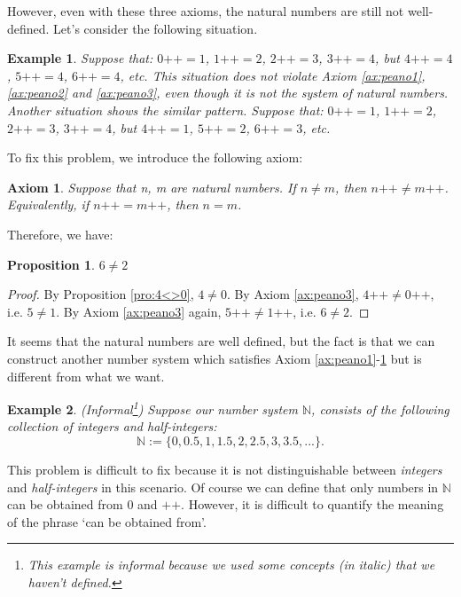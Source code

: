 \documentclass[a4paper,oneside]{book}
\newtheorem*{proof}{\textit{Proof.}}
\newtheorem{axiom}{Axiom}[chapter]
\newtheorem{example}{Example}[section]
\newtheorem{proposition}{Proposition}[section]
\begin{document}
			However, even with these three axioms, the natural numbers are still not well-defined. Let's consider the following situation.
			\begin{example}
				Suppose that: $0\texttt{++}=1$, $1\texttt{++}=2$, $2\texttt{++}=3$, $3\texttt{++}=4$, but $4\texttt{++}=4$, $5\texttt{++}=4$, $6\texttt{++}=4$, etc. This situation does not violate Axiom \ref{ax:peano1}, \ref{ax:peano2} and \ref{ax:peano3}, even though it is not the system of natural numbers.\\
				Another situation shows the similar pattern. Suppose that: $0\texttt{++}=1$, $1\texttt{++}=2$, $2\texttt{++}=3$, $3\texttt{++}=4$, but $4\texttt{++}=1$, $5\texttt{++}=2$, $6\texttt{++}=3$, etc.
			\end{example}
			To fix this problem, we introduce the following axiom:
			\begin{axiom}
				\label{ax:peano4}
				Suppose that n, m are natural numbers. If $ n \neq m$, then $ n\texttt{++} \neq  m \texttt{++}$. Equivalently, if $ n\texttt{++} =  m \texttt{++}$, then $n = m$.
			\end{axiom}
			Therefore, we have:
			\begin{proposition}
				$6 \neq 2$
			\end{proposition}
			\begin{proof}
				By Proposition \ref{pro:4<>0}, $4 \neq 0$. By Axiom \ref{ax:peano3}, $4\texttt{++} \neq  0 \texttt{++}$, i.e. $5 \neq 1$. By Axiom \ref{ax:peano3} again, $5\texttt{++} \neq  1 \texttt{++}$, i.e. $6 \neq 2$.
			\end{proof}
			It seems that the natural numbers are well defined, but the fact is that we can construct another number system which satisfies Axiom \ref{ax:peano1}-\ref{ax:peano4} but is different from what we want.
			\begin{example}
				(Informal\footnote{This example is informal because we used some concepts (in italic) that we haven't defined.}) Suppose our number system $\mathbb{N}$, consists of the following collection of \textit{integers} and \textit{half-integers}:
				\begin{equation*}
					\mathbb{N} := \{0,0.5,1,1.5,2,2.5,3,3.5,...\}.
				\end{equation*}
      \end{example}
			This problem is difficult to fix because it is not distinguishable between \textit{integers} and \textit{half-integers} in this scenario. Of course we can define that only numbers in $\mathbb{N}$ can be obtained from $0$ and $\texttt{++}$. However, it is difficult to quantify the meaning of the phrase `can be obtained from'.\\
\end{document}
